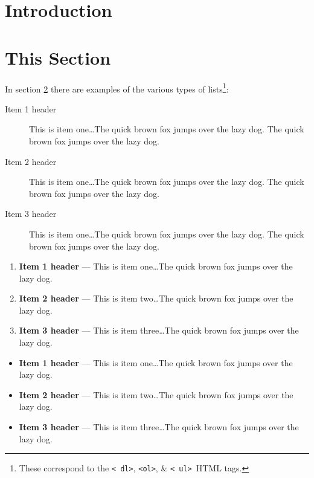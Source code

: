 \documentclass[11pt]{article}%
\begin{document}
\begin{multicols*}{2}

\section{Introduction}
\label{Introduction}

\lipsum[1-3]

\section{This Section}
\label{This Section}

In section \ref{This Section} there are examples of the various
types of lists\footnote{These correspond to the {\tt \textless
dl\textgreater}, {\tt \textless ol\textgreater}, \& {\tt \textless
ul\textgreater}\ HTML tags.}:

\begin{description}
\item[Item 1 header] This is item one\dots The quick brown fox jumps
over the lazy dog. The quick brown fox jumps over the lazy dog.
\item[Item 2 header] This is item one\dots The quick brown fox jumps
over the lazy dog. The quick brown fox jumps over the lazy dog.
\item[Item 3 header] This is item one\dots The quick brown fox jumps
over the lazy dog. The quick brown fox jumps over the lazy dog.
\end{description}

\begin{enumerate}
\item {\bf Item 1 header} --- This is item one\dots The quick brown fox jumps
over the lazy dog.
\item {\bf Item 2 header} --- This is item two\dots The quick brown fox jumps
over the lazy dog.
\item {\bf Item 3 header} --- This is item three\dots The quick brown fox jumps
over the lazy dog.
\end{enumerate}

\begin{itemize}
\item {\bf Item 1 header} --- This is item one\dots The quick brown fox jumps
over the lazy dog.
\item {\bf Item 2 header} --- This is item two\dots The quick brown fox jumps
over the lazy dog.
\item {\bf Item 3 header} --- This is item three\dots The quick brown fox jumps
over the lazy dog.
\end{itemize}



\end{multicols*}
\end{document}
